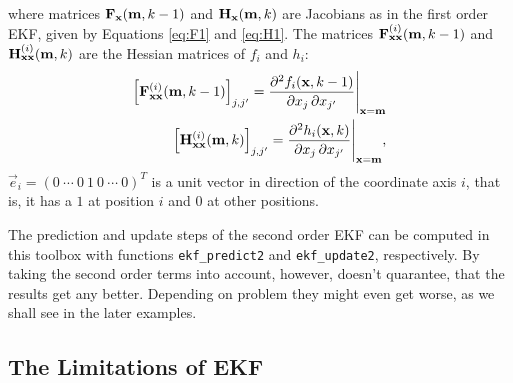   where matrices $\mathbf{F}_{\mathbf{x}}(\mathbf{m},k-1)$ and
  $\mathbf{H}_{\mathbf{x}}(\mathbf{m},k)$ are Jacobians as in the first order EKF, given by
  Equations \eqref{eq:F1} and \eqref{eq:H1}. The matrices
  $\mathbf{F}^{(i)}_{\mathbf{x}\mathbf{x}}(\mathbf{m},k-1)$ and
  $\mathbf{H}^{(i)}_{\mathbf{x}\mathbf{x}}(\mathbf{m},k)$ are the Hessian matrices
  of $f_i$ and $h_i$:
  \begin{align}
   \left[ \mathbf{F}_{\mathbf{x}\mathbf{x}}^{(i)}(\mathbf{m},k-1) \right]_{j,j'}
   = \frac{\partial^2 f_i(\mathbf{x},k-1)}{\partial x_j \, \partial x_{j'}}
  \Bigg|_{\mathbf{x} = \mathbf{m}}
  \label{eq:F2} \\
   \left[ \mathbf{H}_{\mathbf{x}\mathbf{x}}^{(i)}(\mathbf{m},k) \right]_{j,j'}
   = \frac{\partial^2 h_i(\mathbf{x},k)}{\partial x_j \, \partial x_{j'}}
  \Bigg|_{\mathbf{x} = \mathbf{m}},
  \label{eq:H2}
  \end{align}
%
$\vec{e}_i = (0~\cdots~0~1~0~\cdots~0)^T$ is a unit vector in direction of the
coordinate axis $i$, that is, it has a $1$ at position $i$ and $0$ at other positions.

The prediction and update steps of the second order EKF can be
computed in this toolbox with functions \texttt{ekf\_predict2} and
\texttt{ekf\_update2}, respectively. By taking the second order terms
into account, however, doesn't quarantee, that the results get any
better. Depending on problem they might even get worse, as we shall
see in the later examples.

\subsection{The Limitations of EKF}

